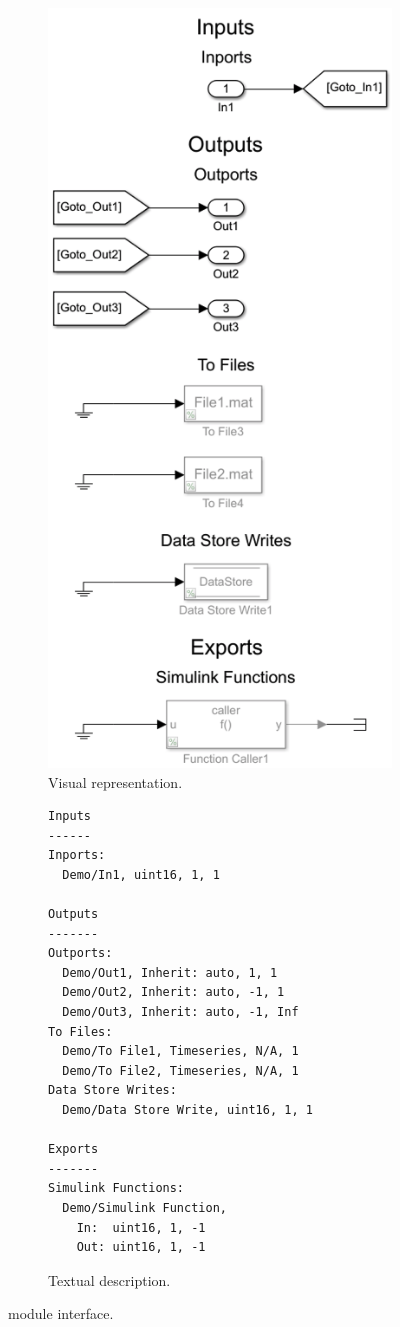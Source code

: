 \documentclass{article}
\begin{document}
\begin{figure}[htb]
\begin{subfigure}[b]{.6\textwidth}
	\includegraphics[height=1.4\textwidth]{../figs/Interface}
	\caption{Visual representation.}
	\label{FIG:interface_visual}
\end{subfigure}
\begin{subfigure}[b]{.4\textwidth}
\lstset{basicstyle=\footnotesize\ttfamily, keepspaces=false, columns=flexible,}
	\begin{lstlisting}
Inputs
------
Inports:
  Demo/In1, uint16, 1, 1
    
Outputs
-------
Outports:
  Demo/Out1, Inherit: auto, 1, 1
  Demo/Out2, Inherit: auto, -1, 1
  Demo/Out3, Inherit: auto, -1, Inf
To Files:
  Demo/To File1, Timeseries, N/A, 1
  Demo/To File2, Timeseries, N/A, 1
Data Store Writes:
  Demo/Data Store Write, uint16, 1, 1

Exports
-------
Simulink Functions:
  Demo/Simulink Function, 
    In:  uint16, 1, -1
    Out: uint16, 1, -1
\end{lstlisting}
\caption{Textual description.}
\label{FIG:interface_text}
\end{subfigure}
\caption{\Simulink module interface.}
\label{FIG:simulinkinterface}
\end{figure}
\end{document}
